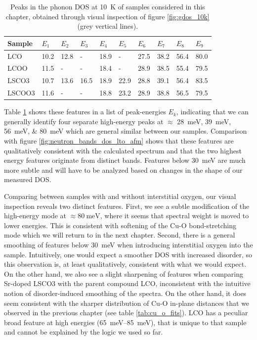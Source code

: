 \begin{table}
    \caption{Peaks in the phonon DOS at \SI{10}{\kelvin} of samples considered in this chapter, obtained through visual inspection of figure \ref{fig:gdos_10k} (grey vertical lines).}
    \label{tab:gdos_features_10K}
    \centering
    \begin{tabular}{llllllllll}
        \toprule
          Sample &  $E_1$ & $E_2$ & $E_3$ &  $E_4$ & $E_5$ &  $E_6$ &  $E_7$ &  $E_8$ &  $E_9$ \\
        \midrule
             LCO &   10.2 &  12.8 &     - &   18.9 &     - &   27.5 &   38.2 &   56.4 &   80.0 \\
            LCOO &   11.5 &     - &     - &   18.4 &     - &   28.9 &   38.5 &   55.4 &   79.5 \\
           LSCO3 &   10.7 &  13.6 &  16.5 &   18.9 &  22.9 &   28.8 &   39.1 &   56.4 &   83.5 \\
         LSCOO3 &   11.6 &     - &     - &   18.8 &  23.2 &   28.9 &   38.8 &   56.5 &   79.5 \\
        \bottomrule
    \end{tabular}
\end{table}

Table \ref{tab:gdos_features_10K} shows these features in a list of peak-energies $E_k$, indicating that we can generally identify four separate high-energy peaks at $\approx$ \SIlist{28;39;56;80}{\milli\eV} which are general similar between our samples. Comparison with figure \ref{fig:neutron_bands_dos_lto_afm} shows that these features are qualitatively consistent with the calculated spectrum and that the two highest energy features originate from distinct bands. Features below \SI{30}{\milli\eV} are much more subtle and will have to be analyzed based on changes in the shape of our measured DOS.

Comparing between samples with and without interstitial oxygen, our visual inspection reveals two distinct features. First, we see a subtle modification of the high-energy mode at $\approx \SI{80}{\milli\eV}$, where it seems that spectral weight is moved to lower energies. This is consistent with softening of the Cu-O bond-stretching mode which we will return to in the next chapter. Second, there is a general smoothing of features below \SI{30}{\milli\eV} when introducing interstitial oxygen into the sample. Intuitively, one would expect a smoother DOS with increased disorder, so this observation is, at least qualitatively, consistent with what we would expect. On the other hand, we also see a slight sharpening of features when comparing Sr-doped LSCO3 with the parent compound LCO, inconsistent with the intuitive notion of disorder-induced smoothing of the spectra. On the other hand, it does seem consistent with the sharper distribution of Cu-O in-plane distances that we observed in the previous chapter (see table \ref{tab:cu_o_fits}). LCO has a peculiar broad feature at high energies (\SIrange{65}{85}{\milli\eV}), that is unique to that sample and cannot be explained by the logic we used so far.


